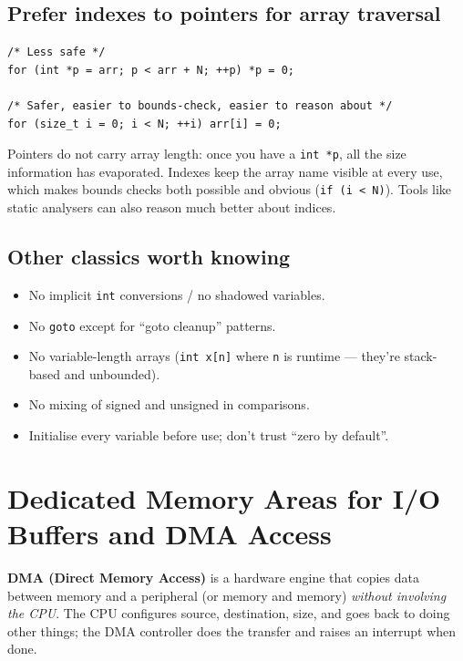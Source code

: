 \documentclass[11pt,a4paper]{article}
\begin{document}
\subsection{Prefer indexes to pointers for array traversal}

\begin{lstlisting}[style=C]
/* Less safe */
for (int *p = arr; p < arr + N; ++p) *p = 0;

/* Safer, easier to bounds-check, easier to reason about */
for (size_t i = 0; i < N; ++i) arr[i] = 0;
\end{lstlisting}

Pointers do not carry array length: once you have a \texttt{int *p},
all the size information has evaporated. Indexes keep the array name
visible at every use, which makes bounds checks both possible and
obvious (\texttt{if (i < N)}). Tools like static analysers can also reason
much better about indices.

\subsection{Other classics worth knowing}

\begin{itemize}[leftmargin=*]
    \item No implicit \texttt{int} conversions / no shadowed variables.
    \item No \texttt{goto} except for ``goto cleanup'' patterns.
    \item No variable-length arrays (\texttt{int x[n]} where \texttt{n} is
    runtime --- they're stack-based and unbounded).
    \item No mixing of signed and unsigned in comparisons.
    \item Initialise every variable before use; don't trust ``zero by default''.
\end{itemize}

\section{Dedicated Memory Areas for I/O Buffers and DMA Access}
\label{sec:dma}

\textbf{DMA (Direct Memory Access)} is a hardware engine that copies data
between memory and a peripheral (or memory and memory) \emph{without
involving the CPU}. The CPU configures source, destination, size, and
goes back to doing other things; the DMA controller does the transfer
and raises an interrupt when done.
\end{document}
